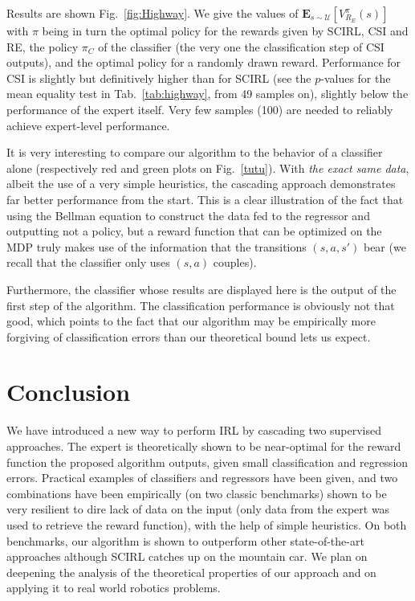 \documentclass{llncs}
\begin{document}
Results are shown Fig.~\ref{fig:Highway}. We give the values of $\mathbf{E}_{s\sim\mathcal{U}}[V^{\pi}_{R_E}(s)]$ with $\pi$ being in turn the optimal policy for the rewards given by SCIRL, CSI and RE, the policy $\pi_C$ of the classifier (the very one the classification step of CSI outputs), and the optimal policy for a randomly drawn reward. Performance for CSI is slightly but definitively higher than for SCIRL (see the $p$-values for the mean equality test in Tab.~\ref{tab:highway}, from 49 samples on), slightly below the performance of the expert itself. Very few samples (100) are needed to reliably achieve expert-level performance.

It is very interesting to compare our algorithm to the behavior of a classifier alone (respectively red and green plots on Fig.~\ref{tutu}). With \emph{the exact same data}, albeit the use of a very simple heuristics, the cascading approach demonstrates far better performance from the start. This is a clear illustration of the fact that using the Bellman equation to construct the data fed to the regressor and outputting not a policy, but a reward function that can be optimized on the MDP truly makes use of the information that the transitions $(s,a,s')$ bear (we recall that the classifier only uses $(s,a)$ couples).

Furthermore, the classifier whose results are displayed here is the output of the first step of the algorithm. The classification performance is obviously not that good, which points to the fact that our algorithm may be empirically more forgiving of classification errors than our theoretical bound lets us expect.

\section{Conclusion}
\label{sec:conclusion}
We have introduced a new way to perform IRL by cascading two supervised approaches. The expert is theoretically shown to be near-optimal for the reward function the proposed algorithm outputs, given small classification and regression errors. Practical examples of classifiers and regressors have been given, and two combinations have been empirically (on two classic benchmarks) shown to be very resilient to dire lack of data on the input (only data from the expert was used to retrieve the reward function), with the help of simple heuristics. On both benchmarks, our algorithm is shown to outperform other state-of-the-art approaches although SCIRL catches up on the mountain car. We plan on deepening the analysis of the theoretical properties of our approach and on applying it to real world robotics problems.



\end{document}
